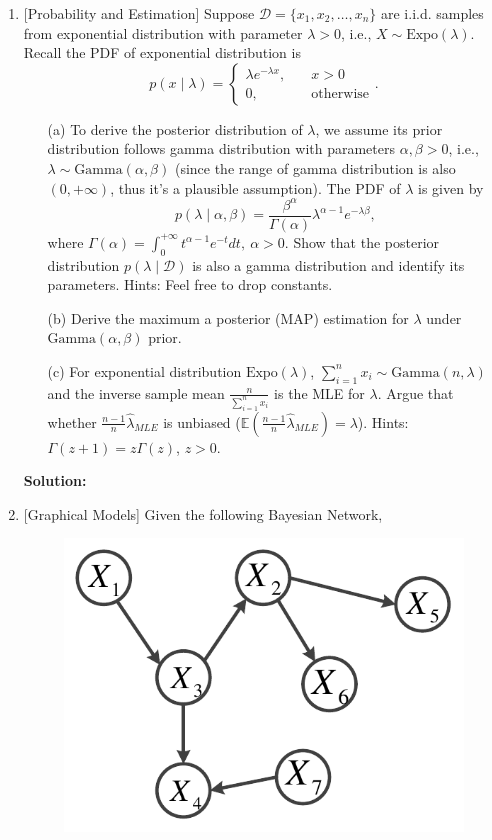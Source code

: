 \documentclass[10pt]{article}
\begin{document}
\begin{enumerate}[1.]
	\item {} [Probability and Estimation]
	Suppose $\mathcal{D}=\{ x_{1}, x_{2}, \ldots, x_{n} \}$ are i.i.d. samples from exponential distribution with parameter 
	$\lambda > 0$, i.e., $X \sim \text{Expo}(\lambda)$. Recall the PDF of exponential distribution is
	\[
		p(x\mid \lambda) = \begin{cases}
		\lambda e^{-\lambda x},&\quad x > 0 \\
		0,&\quad \text{otherwise}
		\end{cases}.
	\]
	      \begin{itemize}
			\item[(a)] To derive the posterior distribution of $\lambda$, we assume its prior 
			distribution follows gamma distribution with parameters $\alpha,\beta > 0$, i.e., 
			$\lambda \sim\text{Gamma}(\alpha,\beta)$ (since the range of gamma distribution 
			is also $(0,+\infty)$, thus it's a plausible assumption). The PDF of $\lambda$ is 
			given by
			\[
				p(\lambda\mid \alpha,\beta) = \frac{\beta^{\alpha}}{\Gamma(\alpha)} \lambda^{\alpha-1}e^{-\lambda\beta},
			\]
			where $\Gamma(\alpha) = \int_{0}^{+\infty} t^{\alpha-1}e^{-t}dt,\ \alpha>0$. 
			Show that the posterior distribution $p(\lambda\mid \mathcal{D})$ is also a 
			gamma distribution and identify its parameters. Hints: Feel free to drop 
			constants. 

			\item[(b)] Derive the maximum a posterior (MAP) estimation for $\lambda$ 
			under $\text{Gamma}(\alpha,\beta)$ prior. 
			
			\item[(c)] For exponential distribution $\text{Expo}(\lambda)$, $\sum_{i=1}^{n} x_{i}\sim \text{Gamma}(n,\lambda)$ 
			and the inverse sample mean $\frac{n}{\sum_{i=1}^{n} x_{i}}$ is the MLE for $\lambda$. 
			Argue that whether $\frac{n-1}{n}\hat{\lambda}_{MLE}$ is unbiased ($\mathbb{E}(\frac{n-1}{n}\hat{\lambda}_{MLE})=\lambda$). 
			Hints: $\Gamma(z+1)=z\Gamma(z)$, $z > 0$. 
	      \end{itemize}

      	  
      	  \textbf{Solution:}
      	  
      	  \newpage

	\item {} [Graphical Models]
	Given the following Bayesian Network, 
	\begin{figure}[h]
		\label{fig:bn}
		\vskip 0.2in
		\begin{center}
		\centerline{\includegraphics[width=0.4\columnwidth]{figures/bn}}
		\end{center}
		\vskip -0.2in
	\end{figure}


\end{enumerate}
\end{document}
